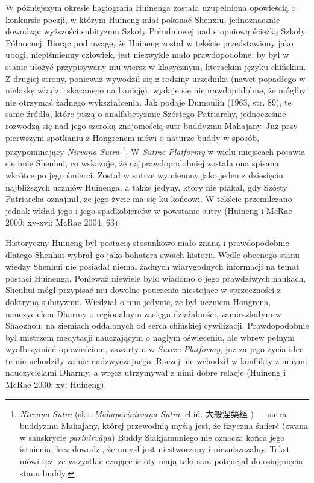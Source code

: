 W późniejszym okresie hagiografia Huinenga została uzupełniona opowieścią o konkursie poezji, w którym Huineng miał pokonać Shenxiu, jednoznacznie dowodząc wyższości subityzmu Szkoły Południowej nad stopniową ścieżką Szkoły Północnej.
Biorąc pod uwagę, że Huineng został w tekście przedstawiony jako ubogi, niepiśmienny człowiek, jest niezwykle mało prawdopodobne, by był w stanie ułożyć przypisywany mu wiersz w klasycznym, literackim języku chińskim.
Z drugiej strony, ponieważ wywodził się z rodziny urzędnika (nawet popadłego w niełaskę władz i skazanego na banicję), wydaje się nieprawdopodobne, że mógłby nie otrzymać żadnego wykształcenia.
Jak podaje Dumoulin (1963, str. 89), te same źródła, które piszą o analfabetyzmie Szóstego Patriarchy, jednocześnie rozwodzą się nad jego szeroką znajomością sutr buddyzmu Mahajany.
Już przy pierwszym spotkaniu z Hongrenem mówi o naturze buddy w sposób, przypominający \textit{Nirvā\d{n}a Sūtra}%
\footnote{\textit{Nirvā\d{n}a Sūtra} (skt. \textit{Mahāparinirvā\d{n}a Sūtra}, chiń. 大般涅槃經 ) --- sutra buddyzmu Mahajany, której przewodnią myślą jest, że fizyczna śmierć (zwana w sanskrycie \textit{parinirvā\d{n}a}) Buddy Siakjamuniego nie oznacza końca jego istnienia, lecz dowodzi, że umysł %
jest niestworzony i niezniszczalny. Tekst mówi też, że wszystkie czujące istoty mają taki sam potencjał do osiągnięcia stanu buddy.}.
W \textit{Sutrze Platformy} w wielu miejscach pojawia się imię Shenhui, co wskazuje, że najprawdopodobniej została ona spisana wkrótce po jego śmierci.
Został w sutrze wymienony jako jeden z dziesięciu najbliższych uczniów Huinenga, a także jedyny, który nie płakał, gdy Szósty Patriarcha oznajmił, że jego życie ma się ku końcowi.
W tekście przemilczano jednak wkład jego i jego spadkobierców w powstanie sutry
(Huineng i McRae 2000: xv-xvi; McRae 2004: 63).

Historyczny Huineng był postacią stosunkowo mało znaną i prawdopodobnie dlatego Shenhui wybrał go jako bohatera swoich historii.
Wedle obecnego stanu wiedzy Shenhui nie posiadał niemal żadnych wiarygodnych informacji na temat postaci Huinenga.
Ponieważ niewiele było wiadomo o jego prawdziwych naukach, Shenhui mógł przypisać mu dowolne pouczenia niestojące w sprzeczności z doktryną subityzmu.
Wiedział o nim jedynie, że był uczniem Hongrena, nauczycielem Dharmy o regionalnym zasięgu działalności, zamieszkałym w Shaozhou, na ziemiach oddalonych od serca chińskiej cywilizacji.
Prawdopodobnie był mistrzem medytacji nauczającym o nagłym oświeceniu, ale wbrew pełnym wyolbrzymień opowieściom, zawartym w \textit{Sutrze Platformy}, już za jego życia idee te nie uchodziły za nic nadzwyczajnego.
Raczej nie wchodził w konflikty z innymi nauczycielami Dharmy, a wręcz utrzymywał z nimi dobre relacje
(Huineng i McRae 2000: xv; Huineng).

